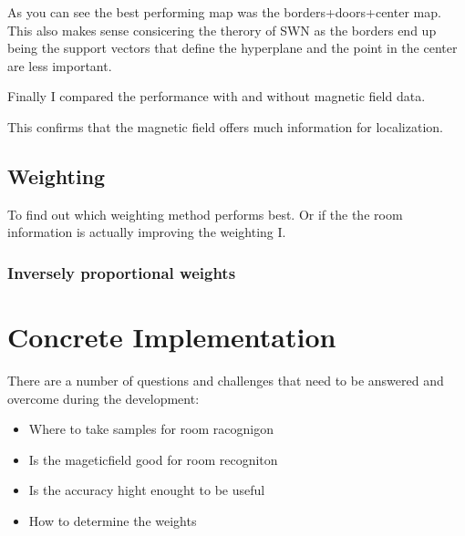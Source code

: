 
As you can see the best performing map was the borders+doors+center map. This also makes sense consicering the therory of SWN as the borders end up being the support vectors that define the hyperplane and the point in the center are less important.

Finally I compared the performance with and without magnetic field data.


This confirms that the magnetic field offers much information for localization.

\subsection{Weighting}

To find out which weighting method performs best. Or if the the room information is actually improving the weighting I. 

\subsubsection{Inversely proportional weights}

\section{Concrete Implementation}

There are a number of questions and challenges that need to be answered and overcome during the development:
\begin{itemize}
\item Where to take samples for room racognigon 
\item Is the mageticfield good for room recogniton
\item Is the accuracy hight enought to be useful
\item How to determine the weights
\end{itemize}